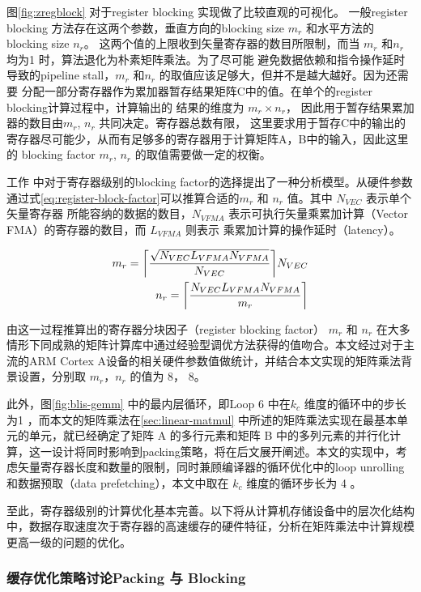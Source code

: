 图\ref{fig:zregblock} 对于register blocking 实现做了比较直观的可视化。
一般register blocking 方法存在这两个参数，垂直方向的blocking size $m_r$ 和水平方法的blocking size $ n_r $。
这两个值的上限收到矢量寄存器的数目所限制，而当 $m_r$ 和$n_r$ 均为1 时，算法退化为朴素矩阵乘法。为了尽可能
避免数据依赖和指令操作延时导致的pipeline stall，$m_r$ 和$n_r$ 的取值应该足够大，但并不是越大越好。因为还需要
分配一部分寄存器作为累加器暂存结果矩阵C中的值。在单个的register blocking计算过程中，计算输出的
结果的维度为 $m_r \times n_r$， 因此用于暂存结果累加器的数目由$m_r$, $n_r$ 共同决定。寄存器总数有限，
这里要求用于暂存C中的输出的寄存器尽可能少，从而有足够多的寄存器用于计算矩阵A，B中的输入，因此这里的
blocking factor $m_r$, $n_r$ 的取值需要做一定的权衡。

工作\cite{Low2016AnalyticalMI} 中对于寄存器级别的blocking factor的选择提出了一种分析模型。从硬件参数
通过式\ref{eq:register-block-factor}可以推算合适的$m_r$ 和 $n_r$ 值。其中 $N_{VEC}$ 表示单个矢量寄存器
所能容纳的数据的数目，$N_{VFMA}$ 表示可执行矢量乘累加计算（Vector FMA）的寄存器的数目，而 $L_{VFMA}$ 则表示
乘累加计算的操作延时（latency）。

\begin{align}
  \label{eq:register-block-factor}
  m_r = \ceil[\bigg]{\frac{\sqrt{N_{VEC}L_{VFMA}N_{VFMA}}}{N_{VEC}}} N_{VEC} \\
  n_r = \ceil[\bigg]{\frac{N_{VEC}L_{VFMA}N_{VFMA}}{m_r}}
\end{align}

由这一过程推算出的寄存器分块因子（register blocking factor） $m_r$ 和 $n_r$ 在大多情形下同成熟的矩阵计算库中通过经验型调优方法获得的值吻合。本文经过对于主流的ARM Cortex A设备的相关硬件参数值做统计，并结合本文实现的矩阵乘法背景设置，分别取 $m_r$，$n_r$ 的值为 8， 8。

此外，图\ref{fig:blis-gemm} 中的最内层循环，即Loop 6 中在$k_c$ 维度的循环中的步长为1 ，而本文的矩阵乘法在\ref{sec:linear-matmul} 中所述的矩阵乘法实现在最基本单元的单元，就已经确定了矩阵 A 的多行元素和矩阵 B 中的多列元素的并行化计算，这一设计将同时影响到packing策略，将在后文展开阐述。本文的实现中，考虑矢量寄存器长度和数量的限制，同时兼顾编译器的循环优化中的loop unrolling和数据预取（data prefetching），本文中取在 $k_c$ 维度的循环步长为 4 。

至此，寄存器级别的计算优化基本完善。以下将从计算机存储设备中的层次化结构中，数据存取速度次于寄存器的高速缓存的硬件特征，分析在矩阵乘法中计算规模更高一级的问题的优化。

\subsubsection{缓存优化策略讨论Packing 与 Blocking}

